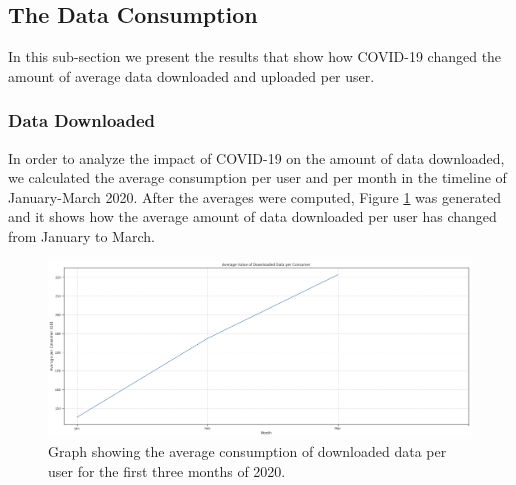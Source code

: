 \documentclass[conference,10pt]{IEEEtran}
\begin{document}


\subsection{The Data Consumption}
\label{sec:the-data-consumption}
In this sub-section we present the results that show how COVID-19 changed the amount of average data downloaded and uploaded per user.

\subsubsection{Data Downloaded}
\label{sec:download-data-consumption}

In order to analyze the impact of COVID-19 on the amount of data downloaded, we calculated the average consumption per user and per month in the timeline of January-March 2020. After the averages were computed, Figure \ref{fig:download2020} was generated and it shows how the average amount of data downloaded per user has changed from January to March.

\begin{figure}
\centering
\includegraphics[width=1.0\linewidth]{figs/download2020.PNG}
\caption{Graph showing the average consumption of downloaded data per user for the first three months of 2020.}
\label{fig:download2020}
\end{figure}
\end{document}
